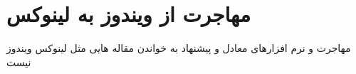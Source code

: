 \section{مهاجرت از ویندوز به لینوکس}
مهاجرت و نرم افزارهای معادل و پیشنهاد به خواندن مقاله هایی مثل لینوکس ویندوز نیست
